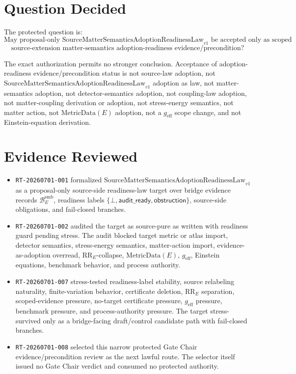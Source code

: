 \documentclass[11pt]{article}
\newcommand{\SMSAR}{\mathrm{SourceMatterSemanticsAdoptionReadinessLaw}_{v1}}
\newcommand{\BridgeDom}{\mathcal B^{\mathrm{smb}}_E}
\newcommand{\AuditReady}{\mathsf{audit\_ready}}
\newcommand{\Obstruction}{\mathsf{obstruction}}
\newcommand{\Bottom}{\bot}
\newcommand{\MetricData}{\mathrm{MetricData}}
\newcommand{\geff}{g_{\mathrm{eff}}}
\begin{document}
\section{Question Decided}

The protected question is:
\[
\text{May proposal-only } \SMSAR \text{ be accepted only as scoped}
\]
\[
\text{source-extension matter-semantics adoption-readiness evidence/precondition?}
\]

The exact authorization permits no stronger conclusion. Acceptance of
adoption-readiness evidence/precondition status is not source-law adoption,
not \(\SMSAR\) adoption as law, not matter-semantics adoption, not
detector-semantics adoption, not coupling-law adoption, not matter-coupling
derivation or adoption, not stress-energy semantics, not matter action, not
\(\MetricData(E)\) adoption, not a \(\geff\) scope change, and not
Einstein-equation derivation.

\section{Evidence Reviewed}

\begin{itemize}[leftmargin=*]
  \item \texttt{RT-20260701-001} formalized \(\SMSAR\) as a proposal-only
  source-side readiness-law target over bridge evidence records
  \(\BridgeDom\), readiness labels
  \(\{\Bottom,\AuditReady,\Obstruction\}\), source-side obligations, and
  fail-closed branches.
  \item \texttt{RT-20260701-002} audited the target as source-pure as
  written with readiness guard pending stress. The audit blocked target
  metric or atlas import, detector semantics, stress-energy semantics,
  matter-action import, evidence-as-adoption overread,
  \(\mathrm{RR}_E\)-collapse, \(\MetricData(E)\), \(\geff\), Einstein
  equations, benchmark behavior, and process authority.
  \item \texttt{RT-20260701-007} stress-tested readiness-label stability,
  source relabeling naturality, finite-variation behavior, certificate
  deletion, \(\mathrm{RR}_E\) separation, scoped-evidence pressure,
  no-target certificate pressure, \(\geff\) pressure, benchmark pressure, and
  process-authority pressure. The target stress-survived only as a
  bridge-facing draft/control candidate path with fail-closed branches.
  \item \texttt{RT-20260701-008} selected this narrow protected Gate Chair
  evidence/precondition review as the next lawful route. The selector itself
  issued no Gate Chair verdict and consumed no protected authority.
\end{itemize}
\end{document}
